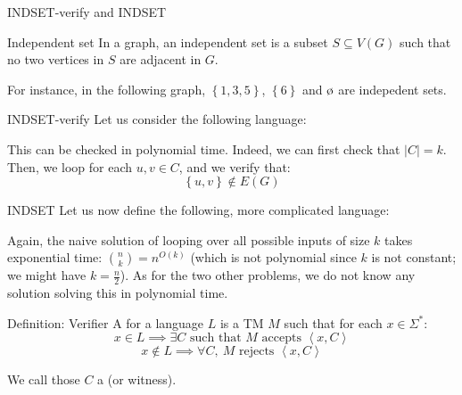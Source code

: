 \documentclass[a4paper]{article}
\begin{document}
\begin{parag}{INDSET-verify and INDSET}
    \begin{subparag}{Independent set}
        In a graph, an independent set is a subset $S \subseteq V\left(G\right)$ such that no two vertices in $S$ are adjacent in $G$. 

        For instance, in the following graph, $\left\{1, 3, 5\right\}$, $\left\{6\right\}$ and $\o$ are indepedent sets.
    \end{subparag}

    \begin{subparag}{INDSET-verify}
        Let us consider the following language: 
        
        This can be checked in polynomial time. Indeed, we can first check that $\left|C\right| = k$. Then, we loop for each $u, v \in C$, and we verify that: 
        \[\left\{u, v\right\} \not \in E\left(G\right)\]
    \end{subparag}
    
    \begin{subparag}{INDSET}
        Let us now define the following, more complicated language: 

        Again, the naive solution of looping over all possible inputs of size $k$ takes exponential time: $\binom{n}{k} = n^{O\left(k\right)}$ (which is not polynomial since $k$ is not constant; we might have $k = \frac{n}{2}$). As for the two other problems, we do not know any solution solving this in polynomial time.
    \end{subparag}
\end{parag}

\begin{parag}{Definition: Verifier}
    A  for a language $L$ is a TM $M$ such that for each $x \in \Sigma^*$: 
    \[x \in L \implies \exists C \text{ such that $M$ accepts $\left\langle x, C \right\rangle$}\]
    \[x \not \in L \implies \forall C,\ \text{$M$ rejects $\left\langle x, C \right\rangle$}\]

    We call those $C$ a  (or witness).
\end{parag}
\end{document}
